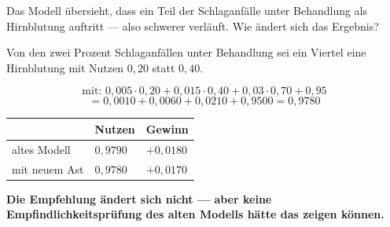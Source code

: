 \begin{aufgabe}
Das Modell übersieht, dass ein Teil der Schlaganfälle unter Behandlung als Hirnblutung auftritt --- also schwerer verläuft. Wie ändert sich das Ergebnis?

\loesung
{}
Von den zwei Prozent Schlaganfällen unter Behandlung sei ein Viertel eine Hirnblutung mit Nutzen $0{,}20$ statt $0{,}40$.

\[ \text{mit: } 0{,}005\cdot0{,}20 + 0{,}015\cdot0{,}40 + 0{,}03\cdot0{,}70 + 0{,}95 \]
\[ = 0{,}0010 + 0{,}0060 + 0{,}0210 + 0{,}9500 = 0{,}9780 \]

\begin{center}
{\small
\renewcommand{\arraystretch}{1.48}
\begin{tabular}{@{}P{2.8cm}P{2.2cm}P{2.4cm}@{}}
\toprule
& \textbf{Nutzen} & \textbf{Gewinn}\\
\midrule
altes Modell & $0{,}9790$ & $+0{,}0180$\\
mit neuem Ast & $0{,}9780$ & $+0{,}0170$\\
\bottomrule
\end{tabular}}
\end{center}

\begin{center}
\begin{minipage}{0.9\textwidth}
\textbf{Die Empfehlung ändert sich nicht --- aber keine Empfindlichkeitsprüfung des alten Modells hätte das zeigen können.}
\end{minipage}
\end{center}

\begin{center}
\begin{minipage}{0.88\textwidth}
\end{minipage}
\end{center}
\end{aufgabe}

